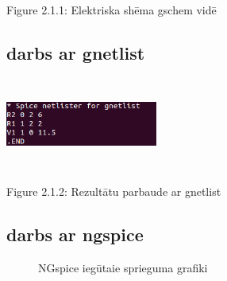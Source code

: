 \documentclass{report}
\begin{document}
            \caption{Figure 2.1.1: Elektriska shēma gschem vidē}
\subsection{darbs ar gnetlist}

\includegraphics[width=5cm, height=3cm]{f.png}
\caption{Figure 2.1.2: Rezultātu parbaude ar gnetlist}

\subsection{darbs ar ngspice}
\begin{figure}[h]
        \centering
        \label{fig:my_label2}
    \end{figure}
    \begin{figure}[h]
         \centering
        \caption{NGspice iegūtaie sprieguma grafiki}
        \label{fig:my_label3}
\end{figure}
\end{document}
